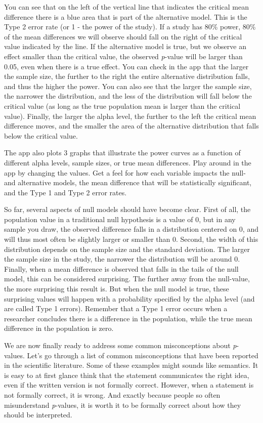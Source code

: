 \documentclass[
]{krantz}
\begin{document}
You can see that on the left of the vertical line that indicates the critical mean difference there is a blue area that is part of the alternative model. This is the Type 2 error rate (or 1 - the power of the study). If a study has 80\% power, 80\% of the mean differences we will observe should fall on the right of the critical value indicated by the line. If the alternative model is true, but we observe an effect smaller than the critical value, the observed \emph{p}-value will be larger than 0.05, even when there is a true effect. You can check in the app that the larger the sample size, the further to the right the entire alternative distribution falls, and thus the higher the power. You can also see that the larger the sample size, the narrower the distribution, and the less of the distribution will fall below the critical value (as long as the true population mean is larger than the critical value). Finally, the larger the alpha level, the further to the left the critical mean difference moves, and the smaller the area of the alternative distribution that falls below the critical value.

The app also plots 3 graphs that illustrate the power curves as a function of different alpha levels, sample sizes, or true mean differences. Play around in the app by changing the values. Get a feel for how each variable impacts the null- and alternative models, the mean difference that will be statistically significant, and the Type 1 and Type 2 error rates.

So far, several aspects of null models should have become clear. First of all, the population value in a traditional null hypothesis is a value of 0, but in any sample you draw, the observed difference falls in a distribution centered on 0, and will thus most often be slightly larger or smaller than 0. Second, the width of this distribution depends on the sample size and the standard deviation. The larger the sample size in the study, the narrower the distribution will be around 0. Finally, when a mean difference is observed that falls in the tails of the null model, this can be considered surprising. The further away from the null-value, the more surprising this result is. But when the null model is true, these surprising values will happen with a probability specified by the alpha level (and are called Type 1 errors). Remember that a Type 1 error occurs when a researcher concludes there is a difference in the population, while the true mean difference in the population is zero.

We are now finally ready to address some common misconceptions about \emph{p}-values. Let's go through a list of common misconceptions that have been reported in the scientific literature. Some of these examples might sounds like semantics. It is easy to at first glance think that the statement communicates the right idea, even if the written version is not formally correct. However, when a statement is not formally correct, it is wrong. And exactly because people so often misunderstand \emph{p}-values, it is worth it to be formally correct about how they should be interpreted.
\end{document}
